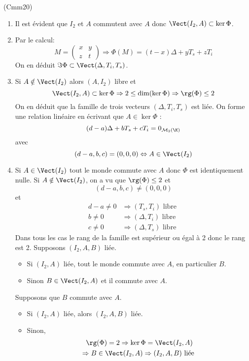 \begin{tiny}(Cmm20)\end{tiny}
\begin{enumerate}
  \item Il est évident que $I_2$ et $A$ commutent avec $A$ donc $\Vect(I_2,A)\subset\ker \Phi$.
  \item Par le calcul:
\begin{displaymath}
M=
\begin{pmatrix}
x & y \\ z & t  
\end{pmatrix}
\Rightarrow 
\Phi(M) = (t-x)\Delta + yT_s + zT_i 
\end{displaymath}
On en déduit $\Im \Phi \subset \Vect(\Delta,T_i,T_s)$.

  \item Si $A\notin \Vect(I_2)$ alors $(A,I_2)$ libre et 
\begin{displaymath}
\Vect(I_2,A)\subset \ker \Phi \Rightarrow 2\leq \dim(\ker \Phi)
\Rightarrow \rg(\Phi) \leq 2
\end{displaymath}
On en déduit que la famille de trois vecteurs $(\Delta,T_i,T_s)$ est liée. On forme une relation linéaire en écrivant que $A\in \ker \Phi$ :
\begin{displaymath}
 (d-a)\Delta + bT_s + cT_i = 0_{\mathcal{M}_2(\K)} 
\end{displaymath}
avec
\begin{displaymath}
(d-a,b,c)=(0,0,0)\Leftrightarrow A \in \Vect(I_2)  
\end{displaymath}
 \item Si $A\in \Vect(I_2)$ tout le monde commute avec $A$ donc $\Phi$ est identiquement nulle.\newline
Si $A\notin \Vect(I_2)$, on a vu que $\rg(\Phi)\leq 2$ et 
\begin{displaymath}
(d-a,b,c)\neq(0,0,0)  
\end{displaymath}
et
\begin{align*}
d-a \neq 0 &\Rightarrow (T_s,T_i)\text{ libre } \\
b \neq 0 &\Rightarrow (\Delta,T_i)\text{ libre } \\
c \neq 0 &\Rightarrow (\Delta,T_s)\text{ libre } 
\end{align*}
Dans tous les cas le rang de la famille est supérieur ou égal à 2 donc le rang est 2.
Supposons $(I_2,A,B)$ liée.
\begin{itemize}
  \item Si $(I_2,A)$ liée, tout le monde commute avec $A$, en particulier $B$.
  \item Sinon $B\in \Vect(I_2,A)$ et il commute avec $A$.
\end{itemize}
Supposons que $B$ commute avec $A$.
\begin{itemize}
  \item Si $(I_2,A)$ liée, alors $(I_2,A,B)$ liée.
  \item Sinon,
\begin{multline*}
\rg(\Phi)=2 \Rightarrow \ker \Phi = \Vect(I_2,A) \\
\Rightarrow  B \in \Vect(I_2,A) \Rightarrow (I_2,A,B) \text{ liée }
\end{multline*}

\end{itemize}


\end{enumerate}
